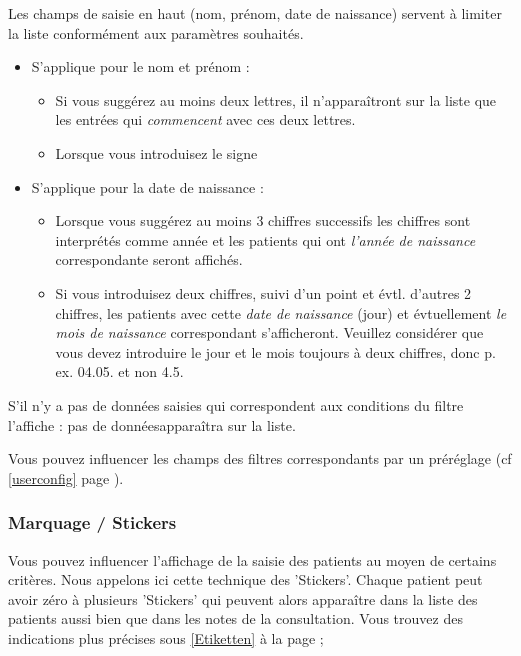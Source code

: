 Les champs de saisie en haut (nom, prénom, date de naissance) servent à limiter la liste conformément aux paramètres souhaités.
\begin{itemize}
  \item S'applique pour le nom et prénom :
	\begin{itemize}
      \item Si vous suggérez au moins deux lettres, il n'apparaîtront sur la liste que les entrées qui \textit{commencent} avec ces deux lettres.
      \item Lorsque vous introduisez le signe %
    \end{itemize}
  \item S'applique pour la date de naissance :
	\begin{itemize}
      \item Lorsque vous suggérez au moins 3 chiffres successifs les chiffres sont interprétés comme année et les patients qui ont \textit{l'année de naissance } correspondante seront affichés.
      \item Si vous introduisez deux chiffres, suivi d'un point et évtl. d'autres 2 chiffres, les patients avec cette \textit{date de naissance } (jour) et évtuellement \textit{le mois de naissance } correspondant s'afficheront.
      Veuillez considérer que vous devez introduire le jour et le mois toujours à deux chiffres, donc p. ex. 04.05. et non 4.5.
     \end{itemize}
\end{itemize}
S'il n'y a pas de données saisies qui correspondent aux conditions du filtre l'affiche : \glqq pas de données\grqq apparaîtra sur la liste.

\medskip
{} 
Vous pouvez influencer les champs des filtres correspondants par un préréglage (cf \ref{userconfig} page \pageref{userconfig}).

\subsubsection{Marquage / Stickers}
Vous pouvez influencer l'affichage de la saisie des patients au moyen de certains critères.
Nous appelons ici cette technique des 'Stickers'. Chaque patient peut avoir zéro à plusieurs 'Stickers' qui peuvent alors apparaître dans la liste des patients aussi bien que dans les notes de la consultation. Vous trouvez des indications plus précises sous  \ref{Etiketten} à la page \pageref{Etiketten};

